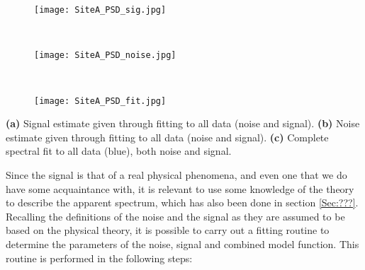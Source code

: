 \documentclass[../../CompleteThesis/Complete_1stDraft.tex]{subfiles}
\begin{document}
\begin{marginfigure}
	\centering
	\begin{subfigure}{\marginparwidth}
		\centering
		\texttt{[image: SiteA\_PSD\_sig.jpg]}
		\caption{\footnotesize}
		\label{fig:SiteA_PSD_sig}
	\end{subfigure}\\[1ex]
	
	\begin{subfigure}{\marginparwidth}
		\centering
		\texttt{[image: SiteA\_PSD\_noise.jpg]}
		\caption{\footnotesize}
		\label{fig:SiteA_PSD_noise}
	\end{subfigure}\\[1ex]
	
	\begin{subfigure}{\marginparwidth}
		\centering
		\texttt{[image: SiteA\_PSD\_fit.jpg]}
		\caption{\footnotesize}
		\label{fig:SiteA_PSD_fit}
	\end{subfigure}
	\caption[Isolated spectral fits, Site A]{\footnotesize\textbf{(a)} Signal estimate given through fitting to all data (noise and signal). \textbf{(b)} Noise estimate given through fitting to all data (noise and signal). \textbf{(c)} Complete spectral fit to all data (blue), both noise and signal.}
	\label{fig:SpectralFitsIsolated}
\end{marginfigure}
Since the signal is that of a real physical phenomena, and even one that we do have some acquaintance with, it is relevant to use some knowledge of the theory to describe the apparent spectrum, which has also been done in section \ref{Sec:???}. Recalling the definitions of the noise and the signal as they are assumed to be based on the physical theory, it is possible to carry out a fitting routine to determine the parameters of the noise, signal and combined model function. This routine is performed in the following steps:
\end{document}

